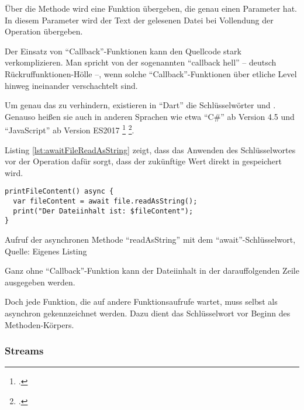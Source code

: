 Über die Methode  wird eine Funktion übergeben, die genau einen Parameter hat.
In diesem Parameter wird der Text der gelesenen Datei bei Vollendung der Operation übergeben.

Der Einsatz von \enquote{Callback}-Funktionen kann den Quellcode stark verkomplizieren.
 Man spricht von der sogenannten \enquote{callback hell} -- deutsch Rückruffunktionen-Hölle --, wenn solche \enquote{Callback}-Funktionen über etliche Level hinweg ineinander verschachtelt sind.

Um genau das zu verhindern, existieren in \enquote{Dart} die Schlüsselwörter  und .
Genauso heißen sie auch in anderen Sprachen wie etwa \enquote{C\#} ab Version 4.5 und \enquote{JavaScript} ab Version ES2017
\footcite[Vgl.][]{asyncfunctionJavaScriptMDN}
\footcite[Vgl.][]{Asynchronousprogrammingwithasyncandawait}.





Listing \ref{lst:awaitFileReadAsString}
zeigt, dass das Anwenden des Schlüsselwortes  vor der Operation  dafür sorgt, dass der zukünftige Wert direkt in  gespeichert wird.

\ifIncludeFigures
  \begin{listing}[ht]
    \begin{verbatim}
printFileContent() async {
  var fileContent = await file.readAsString();
  print("Der Dateiinhalt ist: $fileContent");
}
\end{verbatim}
    \caption[Aufruf der asynchronen Methode \enquote{readAsString} mit dem \enquote{await}-Schlüsselwort]{Aufruf der asynchronen Methode \enquote{readAsString} mit dem \enquote{await}-Schlüsselwort, Quelle: Eigenes Listing}
    \label{lst:awaitFileReadAsString}
  \end{listing}
\fi

Ganz ohne \enquote{Callback}-Funktion kann der Dateiinhalt in der darauffolgenden Zeile ausgegeben werden.





Doch jede Funktion, die auf andere Funktionsaufrufe wartet, muss selbst als asynchron gekennzeichnet werden.
Dazu dient das  Schlüsselwort vor Beginn des Methoden-Körpers.

\subsubsection{Streams}

